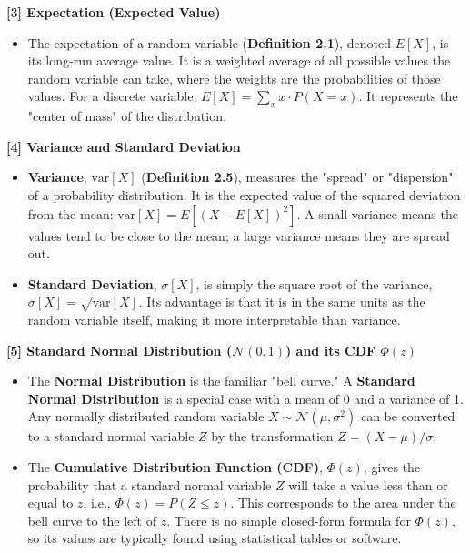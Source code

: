 \documentclass[11pt,a4paper]{article}
\begin{document}
\hypertarget{concept:ev}{\textbf{[3] Expectation (Expected Value)}}
\begin{itemize}
    \item[] The expectation of a random variable (\textbf{Definition 2.1}), denoted $E[X]$, is its long-run average value. It is a weighted average of all possible values the random variable can take, where the weights are the probabilities of those values. For a discrete variable, $E[X] = \sum_x x \cdot P(X=x)$. It represents the "center of mass" of the distribution.
\end{itemize}

\hypertarget{concept:var}{\textbf{[4] Variance and Standard Deviation}}
\begin{itemize}
    \item[] \textbf{Variance}, $\text{var}[X]$ (\textbf{Definition 2.5}), measures the "spread" or "dispersion" of a probability distribution. It is the expected value of the squared deviation from the mean: $\text{var}[X] = E[(X - E[X])^2]$. A small variance means the values tend to be close to the mean; a large variance means they are spread out.
    \item \textbf{Standard Deviation}, $\sigma[X]$, is simply the square root of the variance, $\sigma[X] = \sqrt{\text{var}[X]}$. Its advantage is that it is in the same units as the random variable itself, making it more interpretable than variance.
\end{itemize}

\hypertarget{concept:stdnormal}{\textbf{[5] Standard Normal Distribution ($\mathcal{N}(0,1)$) and its CDF $\Phi(z)$}}
\begin{itemize}
    \item[] The \textbf{Normal Distribution} is the familiar "bell curve." A \textbf{Standard Normal Distribution} is a special case with a mean of 0 and a variance of 1. Any normally distributed random variable $X \sim \mathcal{N}(\mu, \sigma^2)$ can be converted to a standard normal variable $Z$ by the transformation $Z = (X-\mu)/\sigma$.
    \item The \textbf{Cumulative Distribution Function (CDF)}, $\Phi(z)$, gives the probability that a standard normal variable $Z$ will take a value less than or equal to $z$, i.e., $\Phi(z) = P(Z \le z)$. This corresponds to the area under the bell curve to the left of $z$. There is no simple closed-form formula for $\Phi(z)$, so its values are typically found using statistical tables or software.
\end{itemize}
\end{document}
